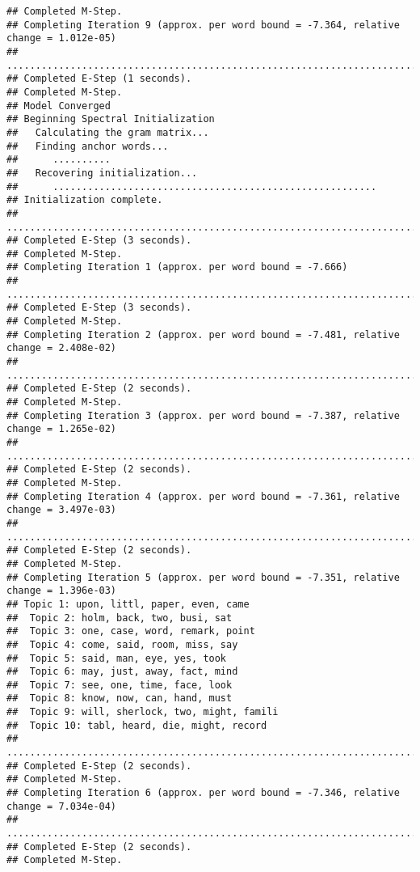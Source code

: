 \documentclass[
]{book}
\begin{document}
\begin{verbatim}
## Completed M-Step. 
## Completing Iteration 9 (approx. per word bound = -7.364, relative change = 1.012e-05) 
## ....................................................................................................
## Completed E-Step (1 seconds). 
## Completed M-Step. 
## Model Converged 
## Beginning Spectral Initialization 
##   Calculating the gram matrix...
##   Finding anchor words...
##      ..........
##   Recovering initialization...
##      ........................................................
## Initialization complete.
## ....................................................................................................
## Completed E-Step (3 seconds). 
## Completed M-Step. 
## Completing Iteration 1 (approx. per word bound = -7.666) 
## ....................................................................................................
## Completed E-Step (3 seconds). 
## Completed M-Step. 
## Completing Iteration 2 (approx. per word bound = -7.481, relative change = 2.408e-02) 
## ....................................................................................................
## Completed E-Step (2 seconds). 
## Completed M-Step. 
## Completing Iteration 3 (approx. per word bound = -7.387, relative change = 1.265e-02) 
## ....................................................................................................
## Completed E-Step (2 seconds). 
## Completed M-Step. 
## Completing Iteration 4 (approx. per word bound = -7.361, relative change = 3.497e-03) 
## ....................................................................................................
## Completed E-Step (2 seconds). 
## Completed M-Step. 
## Completing Iteration 5 (approx. per word bound = -7.351, relative change = 1.396e-03) 
## Topic 1: upon, littl, paper, even, came 
##  Topic 2: holm, back, two, busi, sat 
##  Topic 3: one, case, word, remark, point 
##  Topic 4: come, said, room, miss, say 
##  Topic 5: said, man, eye, yes, took 
##  Topic 6: may, just, away, fact, mind 
##  Topic 7: see, one, time, face, look 
##  Topic 8: know, now, can, hand, must 
##  Topic 9: will, sherlock, two, might, famili 
##  Topic 10: tabl, heard, die, might, record 
## ....................................................................................................
## Completed E-Step (2 seconds). 
## Completed M-Step. 
## Completing Iteration 6 (approx. per word bound = -7.346, relative change = 7.034e-04) 
## ....................................................................................................
## Completed E-Step (2 seconds). 
## Completed M-Step. 

\end{verbatim}
\end{document}
